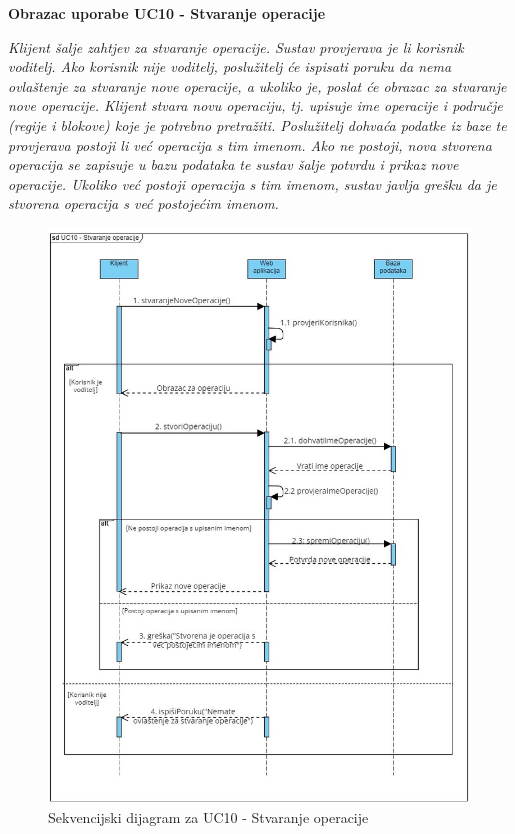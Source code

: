                 \eject

                \textbf{Obrazac uporabe UC10 - Stvaranje operacije}

                \textit{Klijent šalje zahtjev za stvaranje operacije. Sustav provjerava je li korisnik voditelj. Ako korisnik nije voditelj, poslužitelj će ispisati poruku da nema ovlaštenje za stvaranje nove operacije, a ukoliko je, poslat će obrazac za stvaranje nove operacije. Klijent stvara novu operaciju, tj. upisuje ime operacije i područje (regije i blokove) koje je potrebno pretražiti. Poslužitelj dohvaća podatke iz baze te provjerava postoji li već operacija s tim imenom. Ako ne postoji, nova stvorena operacija se zapisuje u bazu podataka te sustav šalje potvrdu i prikaz nove operacije. Ukoliko  već postoji operacija s tim imenom, sustav javlja grešku da je stvorena operacija s već postojećim imenom.}
                
                \begin{figure}[H] \includegraphics[width=\linewidth]{./dijagrami/StvaranjeOperacije.jpg}
				    \caption{Sekvencijski dijagram za UC10 - Stvaranje operacije}
				    \end{figure}

